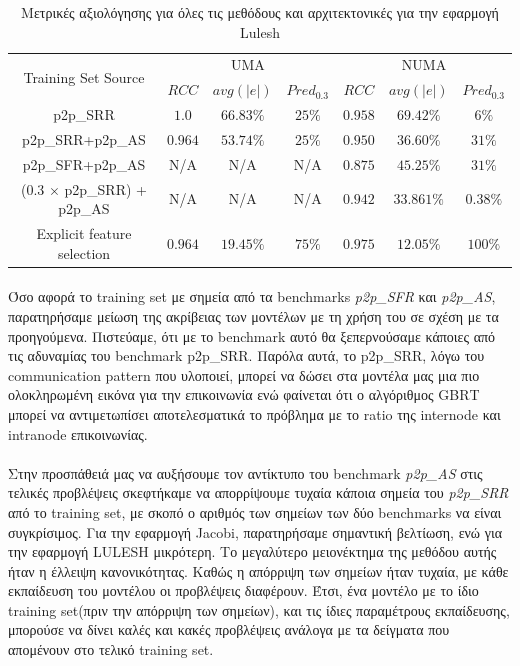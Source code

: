 \begin{table}[h]
\centering
\footnotesize
\captionsetup{justification=centering,margin=0cm}
\caption{Μετρικές αξιολόγησης για όλες τις μεθόδους και αρχιτεκτονικές για την εφαρμογή Lulesh}
\label{table:metrics_lulesh}
\begin{tabular}{c|ccc|ccc}
\multirow{2}{*}{Training Set Source} &                              \multicolumn{3}{c}{UMA}             & \multicolumn{3}{c}{NUMA}            \\
         & $RCC$ & $avg(|e|)$ & $Pred_{0.3}$ & $RCC$ & $avg(|e|)$ & $Pred_{0.3}$  \\ \hline \hline
p2p\_SRR & $1.0$ & $66.83\%$ & $25\%$ & $ 0.958 $ & $ 69.42\% $  & $ 6\% $\\
p2p\_SRR+p2p\_AS & $0.964$ & $53.74\%$ & $25\%$ & $0.950$ & $36.60\% $ & $ 31\% $ \\                   
p2p\_SFR+p2p\_AS & N/A & N/A & N/A & $0.875$ & $45.25\%$ & $31\%$ \\
(0.3 $\times$ p2p\_SRR) + p2p\_AS & N/A & N/A & N/A & $0.942 $ & $33.861\% $ & $0.38\% $ \\ 
Explicit feature selection & $0.964$ & $ 19.45\% $ & $ 75\% $ & $0.975$ & $ 12.05\% $ & $100\%$ 
\end{tabular}
\end{table}

\paragraph{}
Όσο αφορά το training set με σημεία από τα benchmarks \textit{p2p\_SFR} και \textit{p2p\_AS}, παρατηρήσαμε μείωση της ακρίβειας των μοντέλων με τη χρήση του σε σχέση με τα προηγούμενα. Πιστεύαμε, ότι με το benchmark αυτό θα ξεπερνούσαμε κάποιες από τις αδυναμίας του benchmark p2p\_SRR. Παρόλα αυτά, το p2p\_SRR, λόγω του  communication pattern που υλοποιεί, μπορεί να δώσει στα μοντέλα μας μια πιο ολοκληρωμένη εικόνα για την επικοινωνία ενώ φαίνεται ότι ο αλγόριθμος GBRΤ μπορεί να αντιμετωπίσει αποτελεσματικά το πρόβλημα με το ratio της internode και intranode επικοινωνίας.

\paragraph{} 
Στην προσπάθειά μας να αυξήσουμε τον αντίκτυπο του benchmark \textit{p2p\_AS} στις τελικές προβλέψεις σκεφτήκαμε να απορρίψουμε τυχαία κάποια σημεία του \textit{p2p\_SRR} από το training set, με σκοπό ο αριθμός των σημείων των δύο benchmarks να είναι συγκρίσιμος. Για την εφαρμογή Jacobi, παρατηρήσαμε σημαντική βελτίωση, ενώ για την εφαρμογή LULESH μικρότερη. Το μεγαλύτερο μειονέκτημα της μεθόδου αυτής ήταν η έλλειψη κανονικότητας. Καθώς η απόρριψη των σημείων ήταν τυχαία, με κάθε εκπαίδευση του μοντέλου οι προβλέψεις διαφέρουν. Έτσι, ένα μοντέλο με το ίδιο training set(πριν την απόρριψη των σημείων), και τις ίδιες παραμέτρους εκπαίδευσης, μπορούσε να δίνει καλές και κακές προβλέψεις ανάλογα με τα δείγματα που απομένουν στο τελικό training set. 



